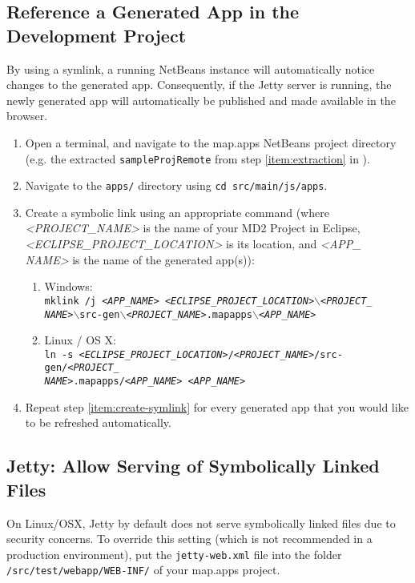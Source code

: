 
\subsection{Reference a Generated App in the Development Project}
\label{subsec:link-apps}

By using a symlink, a running NetBeans instance will automatically notice changes to the generated app. Consequently, if the Jetty server is running, the newly generated app will automatically be published and made available in the browser.

\begin{enumerate}
\item Open a terminal, and navigate to the map.apps NetBeans project directory (e.g. the extracted \texttt{sampleProjRemote} from step \ref{item:extraction} in ).
\item Navigate to the \texttt{apps/} directory using \texttt{cd src/main/js/apps}.
\item Create a symbolic link using an appropriate command (where \textit{<PROJECT\_NAME>} is the name of your MD2 Project in Eclipse, \textit{<ECLIPSE\_PROJECT\_LOCATION>} is its location, and \textit{<APP\_\\NAME>} is the name of the generated app(s)): \label{item:create-symlink}
	\begin{enumerate}
	\item Windows:\\
	\texttt{mklink /j \textit{<APP\_NAME>} \textit{<ECLIPSE\_PROJECT\_LOCATION>}$\backslash$\textit{<PROJECT\_\\
	NAME>}$\backslash$src-gen$\backslash$\textit{<PROJECT\_NAME>}.mapapps$\backslash$\textit{<APP\_NAME>}}
	
	\item Linux / OS X: \\
	\texttt{ln -s \textit{<ECLIPSE\_PROJECT\_LOCATION>}/\textit{<PROJECT\_NAME>}/src-gen/\textit{<PROJECT\_\\
	NAME>}.mapapps/\textit{<APP\_NAME>} \textit{<APP\_NAME>}}
	\end{enumerate}
	
\item Repeat step \ref{item:create-symlink} for every generated app that you would like to be refreshed automatically.
\end{enumerate}


\subsection{Jetty: Allow Serving of Symbolically Linked Files}
\label{subsec:jetty-symbolic-files}

On Linux/OSX, Jetty by default does not serve symbolically linked files due to security concerns.
To override this setting (which is not recommended in a production environment), put the \texttt{jetty-web.xml} file into the folder \texttt{/src/test/webapp/WEB-INF/} of your map.apps project.


